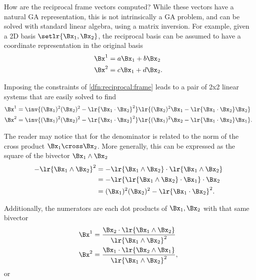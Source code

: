 %
%
How are the reciprocal frame vectors computed?  While these vectors have a natural GA representation, this is not intrinsically a GA problem, and can be solved with standard linear algebra, using a matrix inversion.
For example, given a 2D basis \( \setlr{ \Bx_1, \Bx_2 } \), the reciprocal basis can be assumed to have a coordinate representation in the original basis
\begin{equation}\label{eqn:reciprocal_R2:100}
\begin{aligned}
\Bx^1 &= a \Bx_1 + b \Bx_2 \\
\Bx^2 &= c \Bx_1 + d \Bx_2.
\end{aligned}
\end{equation}

Imposing the constraints of \cref{dfn:reciprocal:frame} leads to a pair of 2x2 linear systems that are easily solved to find
\begin{equation}\label{eqn:reciprocal_R2:120}
\begin{aligned}
\Bx^1 &= \inv{ (\Bx_1)^2 (\Bx_2)^2 - \lr{ \Bx_1 \cdot \Bx_2}^2 } \lr{ (\Bx_2)^2 \Bx_1 - \lr{ \Bx_1 \cdot \Bx_2 } \Bx_2 } \\
\Bx^2 &= \inv{ (\Bx_1)^2 (\Bx_2)^2 - \lr{ \Bx_1 \cdot \Bx_2}^2 } \lr{ (\Bx_1)^2 \Bx_2 - \lr{ \Bx_1 \cdot \Bx_2 } \Bx_1 }.
\end{aligned}
\end{equation}

The reader may notice that for  the denominator is related to the norm of the cross product \( \Bx_1 \cross \Bx_2 \).
More generally, this can be expressed as the square of the bivector \( \Bx_1 \wedge \Bx_2 \)
\begin{equation}\label{eqn:reciprocal_R2:140}
\begin{aligned}
-\lr{\Bx_1 \wedge \Bx_2 }^2
&= -\lr{\Bx_1 \wedge \Bx_2 } \cdot \lr{\Bx_1 \wedge \Bx_2 } \\
&= -\lr{ \lr{\Bx_1 \wedge \Bx_2 } \cdot \Bx_1 } \cdot \Bx_2 \\
&= (\Bx_1)^2 (\Bx_2)^2 - \lr{\Bx_1 \cdot \Bx_2}^2.
\end{aligned}
\end{equation}

Additionally, the numerators are each dot products of \( \Bx_1, \Bx_2 \) with that same bivector
\begin{equation}\label{eqn:reciprocal_R2:160}
\begin{aligned}
\Bx^1 &= \frac{\Bx_2 \cdot \lr{ \Bx_1 \wedge \Bx_2 } }{ \lr{ \Bx_1 \wedge \Bx_2}^2 } \\
\Bx^2 &= \frac{\Bx_1 \cdot \lr{ \Bx_2 \wedge \Bx_1 } }{ \lr{ \Bx_1 \wedge \Bx_2}^2 },
\end{aligned}
\end{equation}
or

